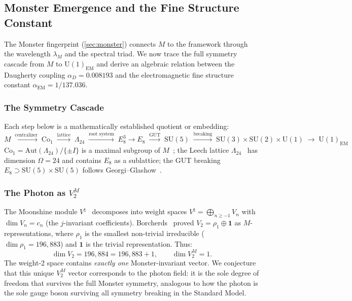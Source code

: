 \documentclass[11pt,a4paper]{article}
\theoremstyle{plain}
\theoremstyle{remark}
\renewcommand{\Omega}{\varOmega}
\begin{document}
\subsection{Monster Emergence and the Fine Structure Constant}
\label{sec:emergence}

The Monster fingerprint (\cref{sec:monster}) connects $M$ to the framework
through the wavelength $\lambda_M$ and the spectral triad.  We now trace
the full symmetry cascade from $M$ to $\mathrm{U}(1)_{\mathrm{EM}}$ and
derive an algebraic relation between the Daugherty coupling
$\alpha_D=0.008193$ and the electromagnetic fine structure constant
$\alpha_{\mathrm{EM}}=1/137.036$.

\subsubsection{The Symmetry Cascade}

Each step below is a mathematically established quotient or embedding:
\[
M \;\xrightarrow{\text{centralizer}}\; \mathrm{Co}_1
  \;\xrightarrow{\text{lattice}}\; \Lambda_{24}
  \;\xrightarrow{\text{root system}}\; E_8^3 \to E_8
  \;\xrightarrow{\text{GUT}}\; \mathrm{SU}(5)
  \;\xrightarrow{\text{breaking}}\; \mathrm{SU}(3){\times}\mathrm{SU}(2){\times}\mathrm{U}(1)
  \;\to\; \mathrm{U}(1)_{\mathrm{EM}}
\]
$\mathrm{Co}_1 = \mathrm{Aut}(\Lambda_{24})/\{\pm I\}$ is a maximal
subgroup of $M$~\cite{conway-norton1979}; the Leech lattice
$\Lambda_{24}$~\cite{conway-sloane1999} has dimension $\Omega=24$ and
contains $E_8$ as a sublattice; the GUT breaking
$E_8 \supset \mathrm{SU}(5)\times\mathrm{SU}(5)$ follows
Georgi--Glashow~\cite{georgi-glashow1974}.

\subsubsection{The Photon as $V_2^M$}

The Moonshine module $V^\natural$~\cite{frenkel-lepowsky-meurman1988}
decomposes into weight spaces
$V^\natural = \bigoplus_{n\geq -1} V_n$ with $\dim V_n = c_n$
(the $j$-invariant coefficients).  Borcherds~\cite{borcherds1992}
proved $V_2 = \rho_1 \oplus \mathbf{1}$ as $M$-representations,
where $\rho_1$ is the smallest non-trivial irreducible ($\dim\rho_1=196{,}883$)
and $\mathbf{1}$ is the trivial representation.  Thus:
\begin{equation}\label{eq:mckay}
  \dim V_2 = 196{,}884 = 196{,}883 + 1,
  \qquad \dim V_2^M = 1.
\end{equation}
The weight-2 space contains \emph{exactly one} Monster-invariant vector.
We conjecture that this unique $V_2^M$ vector corresponds to the
photon field: it is the sole degree of freedom that survives the full
Monster symmetry, analogous to how the photon is the sole gauge boson
surviving all symmetry breaking in the Standard Model.
\end{document}
